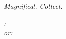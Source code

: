\ifx\benedicamusdominotex\undefined\else
\medskip
\emph{Magnificat}. \emph{Collect}.
\medskip

\def\annot{\small{\benedicamusdominotone}}
\gresetfirstlineaboveinitial{\annot}{\annot}
\setsecondannotation{}
\setspaceafterinitial{0mm}
\setspacebeforeinitial{0mm}
\ifx\benedicamusdominointro\undefined\else
\hspace{3ex}\emph{\benedicamusdominointro:}\\
\fi
{}
\ifx\benedicamusdominotexalt\undefined\else
{%
\vspace{0pt plus 12pt}
\ifx\benedicamusdominoaltintro\undefined
\def\benedicamusdominoaltintro{or}\fi
\hspace{3ex}\emph{\benedicamusdominoaltintro:}\\
\def\annot{\small{\benedicamusdominotonealt}}
\gresetfirstlineaboveinitial{\annot}{\annot}
\setsecondannotation{}
\setspaceafterinitial{0mm}
\setspacebeforeinitial{0mm}
\greblockcustos%
}
\fi
\fi



